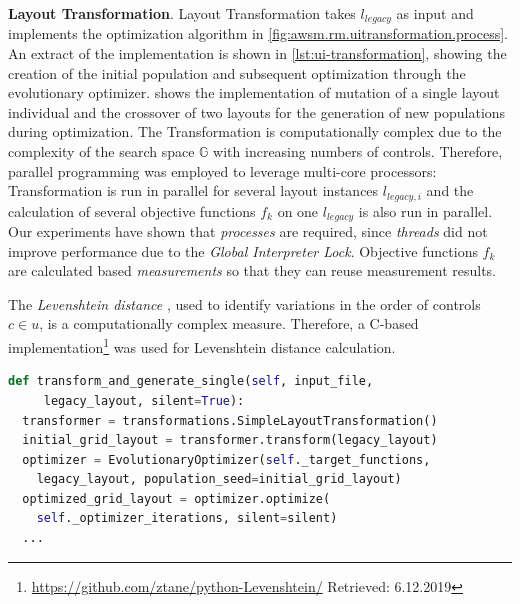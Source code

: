 \vspace{-10pt}
\textbf{Layout Transformation}.
Layout \gls{Transformation} takes \(l_{legacy}\) as input and implements the optimization algorithm in \cref{fig:awsm.rm.uitransformation.process}.
An extract of the implementation is shown in \cref{lst:ui-transformation}, showing the creation of the initial population and subsequent optimization through the evolutionary optimizer.
 shows the implementation of mutation of a single layout individual and the crossover of two layouts for the generation of new populations during optimization.
The \gls{Transformation} is computationally complex due to the complexity of the search space \(\mathbb{G}\) with increasing numbers of controls.
Therefore, parallel programming was employed to leverage multi-core processors: \gls{Transformation} is run in parallel for several layout instances \(l_{legacy,i}\) and the calculation of several objective functions \(f_k\) on one \(l_{legacy}\) is also run in parallel.
Our experiments have shown that \emph{processes} are required, since \emph{threads} did not improve performance due to the \emph{Global Interpreter Lock}.
Objective functions \(f_k\) are calculated based \emph{measurements} so that they can reuse measurement results.

The \emph{Levenshtein distance} \autocite{Black2019Levensthein}, used to identify variations in the order of controls \(c \in u\), is a computationally complex measure.
Therefore, a C-based implementation\footnote{\url{https://github.com/ztane/python-Levenshtein/} Retrieved: 6.12.2019} was used for Levenshtein distance calculation.


\begin{lstlisting}[language=Python, captionpos=t, caption=Layout Transformation, label=lst:ui-transformation]
def transform_and_generate_single(self, input_file,
     legacy_layout, silent=True):
  transformer = transformations.SimpleLayoutTransformation()
  initial_grid_layout = transformer.transform(legacy_layout)
  optimizer = EvolutionaryOptimizer(self._target_functions,
    legacy_layout, population_seed=initial_grid_layout)
  optimized_grid_layout = optimizer.optimize(
    self._optimizer_iterations, silent=silent)
  ...      
\end{lstlisting}

